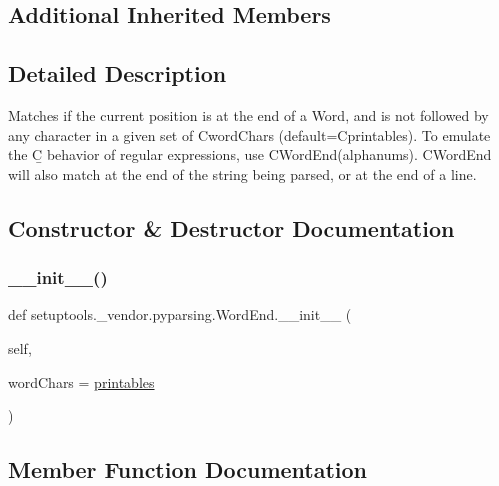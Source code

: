 \subsection*{Additional Inherited Members}


\subsection{Detailed Description}
\begin{DoxyVerb}Matches if the current position is at the end of a Word, and
is not followed by any character in a given set of C{wordChars}
(default=C{printables}). To emulate the C{\b} behavior of regular expressions,
use C{WordEnd(alphanums)}. C{WordEnd} will also match at the end of
the string being parsed, or at the end of a line.
\end{DoxyVerb}
 

\subsection{Constructor \& Destructor Documentation}
\mbox{\label{classsetuptools_1_1__vendor_1_1pyparsing_1_1WordEnd_a16cf414fea8691c74fd805e487967613}} 
\subsubsection{\texorpdfstring{\+\_\+\+\_\+init\+\_\+\+\_\+()}{\_\_init\_\_()}}
{\footnotesize\ttfamily def setuptools.\+\_\+vendor.\+pyparsing.\+Word\+End.\+\_\+\+\_\+init\+\_\+\+\_\+ (\begin{DoxyParamCaption}\item[{}]{self,  }\item[{}]{word\+Chars = {\ttfamily \hyperlink{namespacesetuptools_1_1__vendor_1_1pyparsing_a0a5e033cd7141a5a856b879c7b6e730f}{printables}} }\end{DoxyParamCaption})}



\subsection{Member Function Documentation}
\mbox{\label{classsetuptools_1_1__vendor_1_1pyparsing_1_1WordEnd_ae7b93cbcaa7bdb0ec270bc9763a82d25}} 
